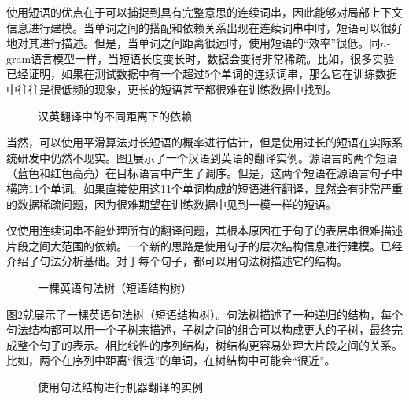 \parinterval 使用短语的优点在于可以捕捉到具有完整意思的连续词串，因此能够对局部上下文信息进行建模。当单词之间的搭配和依赖关系出现在连续词串中时，短语可以很好地对其进行描述。但是，当单词之间距离很远时，使用短语的“效率”很低。同$n$-gram语言模型一样，当短语长度变长时，数据会变得非常稀疏。比如，很多实验已经证明，如果在测试数据中有一个超过5个单词的连续词串，那么它在训练数据中往往是很低频的现象，更长的短语甚至都很难在训练数据中找到。

\begin{figure}[htp]
\centering

\caption{汉英翻译中的不同距离下的依赖}
\label{fig:8-1}
\end{figure}

\parinterval 当然，可以使用平滑算法对长短语的概率进行估计，但是使用过长的短语在实际系统研发中仍然不现实。图\ref{fig:8-1}展示了一个汉语到英语的翻译实例。源语言的两个短语（蓝色和红色高亮）在目标语言中产生了调序。但是，这两个短语在源语言句子中横跨11个单词。如果直接使用这11个单词构成的短语进行翻译，显然会有非常严重的数据稀疏问题，因为很难期望在训练数据中见到一模一样的短语。

\parinterval 仅使用连续词串不能处理所有的翻译问题，其根本原因在于句子的表层串很难描述片段之间大范围的依赖。一个新的思路是使用句子的层次结构信息进行建模。{\chapterthree}已经介绍了句法分析基础。对于每个句子，都可以用句法树描述它的结构。

\begin{figure}[htp]
\centering

\caption{一棵英语句法树（短语结构树）}
\label{fig:8-2}
\end{figure}

\parinterval 图\ref{fig:8-2}就展示了一棵英语句法树（短语结构树）。句法树描述了一种递归的结构，每个句法结构都可以用一个子树来描述，子树之间的组合可以构成更大的子树，最终完成整个句子的表示。相比线性的序列结构，树结构更容易处理大片段之间的关系。比如，两个在序列中距离“很远”的单词，在树结构中可能会“很近”。

\begin{figure}[htp]
\centering

\caption{使用句法结构进行机器翻译的实例}
\label{fig:8-3}
\end{figure}

